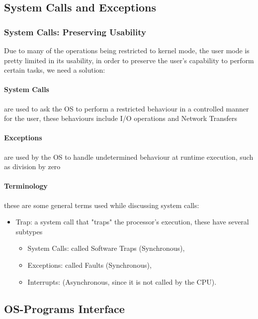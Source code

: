 \documentclass[openright, twoside]{report}
\theoremstyle{definition}
\theoremstyle{example}
\begin{document}
		\subsection{System Calls and Exceptions}
			\subsubsection{System Calls: Preserving Usability} 
			Due to many of the operations being restricted to kernel mode, 
			the user mode is pretty limited in its usability, in order to preserve 
			the user's capability to perform certain tasks, we need a solution:
			
			\paragraph{System Calls} are used to ask the OS to perform a restricted 
			behaviour in a controlled manner for the user, these behaviours 
			include I/O operations and Network Transfers
			
			\paragraph{Exceptions} are used by the OS to handle undetermined 
			behaviour at runtime execution, such as division by zero
			
			\paragraph{Terminology} these are some general terms used while discussing system calls:
			\label{par:trap}
			\begin{itemize}
				\item Trap: a system call that "traps" the processor's execution, these 
				have several subtypes
				\begin{itemize}
					\item System Calls: called Software Traps (Synchronous),
					\item Exceptions: called Faults (Synchronous),
					\item Interrupts: (Asynchronous, since it is not called by the CPU).
				\end{itemize}
			\end{itemize}
			
		
		\subsection{OS-Programs Interface}
\end{document}

